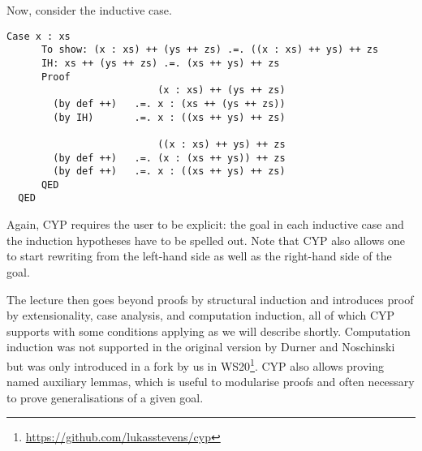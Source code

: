 Now, consider the inductive case.
\begin{lstlisting}[style=cyp]
    Case x : xs
      To show: (x : xs) ++ (ys ++ zs) .=. ((x : xs) ++ ys) ++ zs
      IH: xs ++ (ys ++ zs) .=. (xs ++ ys) ++ zs
      Proof
                          (x : xs) ++ (ys ++ zs)
        (by def ++)   .=. x : (xs ++ (ys ++ zs))
        (by IH)       .=. x : ((xs ++ ys) ++ zs)

                          ((x : xs) ++ ys) ++ zs
        (by def ++)   .=. (x : (xs ++ ys)) ++ zs
        (by def ++)   .=. x : ((xs ++ ys) ++ zs)
      QED
  QED
\end{lstlisting}
Again, CYP requires the user to be explicit: the goal in each inductive case and the induction hypotheses have to be spelled out.
Note that CYP also allows one to start rewriting from the left-hand side as well as the right-hand side of the goal.

The lecture then goes beyond proofs by structural induction and introduces proof by extensionality, case analysis, and computation induction,
all of which CYP supports with some conditions applying as we will describe shortly.
Computation induction was not supported in the original version by Durner and Noschinski but was only introduced in a fork by us in WS20\footnote{\url{https://github.com/lukasstevens/cyp}}.
CYP also allows proving named auxiliary lemmas,
which is useful to modularise proofs
and often necessary to prove generalisations of a given goal.

